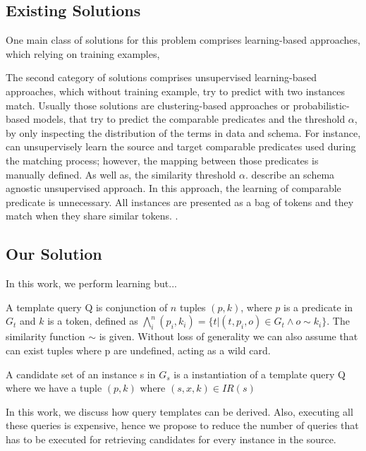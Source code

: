 \subsection{Existing Solutions}
One main class of solutions for this problem comprises learning-based approaches, which relying on training examples, 


The second category of solutions comprises unsupervised learning-based approaches, which without training example, try to  predict with two instances match. Usually those solutions are clustering-based approaches or probabilistic-based models, that try to predict the comparable predicates and the threshold $\alpha$, by only inspecting the distribution of the terms in data and schema.  For instance,  \cite{DBLP:conf/semweb/SongH11} can unsupervisely learn the source and target comparable predicates used during the matching process; however, the mapping between those predicates is manually defined. As well as, the similarity threshold $\alpha$. \cite{DBLP:conf/wsdm/PapadakisINF11} describe an schema agnostic unsupervised approach. In this approach, the learning of comparable predicate is unnecessary. All instances are presented as a bag of tokens and they match when they share similar tokens. 
. 


\subsection{Our Solution}
In this work, we perform learning but...

\begin{definition}   A template query Q is conjunction of $n$ tuples $(p, k)$, where $p$ is a predicate in $G_t$ and $k$ is a token, defined as $ \bigwedge_{i}^n (p_i, k_i)=\{t | (t,p_i,o) \in G_t  \land o \sim k_i  \}$. The similarity function $\sim$ is given. Without loss of generality we can also assume that can exist tuples where p are undefined, acting as a wild card. 
\end{definition} 
 
\begin{definition}   A candidate set of an instance s in $G_s$ is a instantiation of a template query Q where we have a tuple $(p,k)$ where $(s,x,k) \in IR(s)$
\end{definition} 
In this work, we discuss how query templates can be derived. Also, executing all these queries is expensive, hence we propose to reduce the number of queries that has to be executed for retrieving candidates for every instance in the source.



